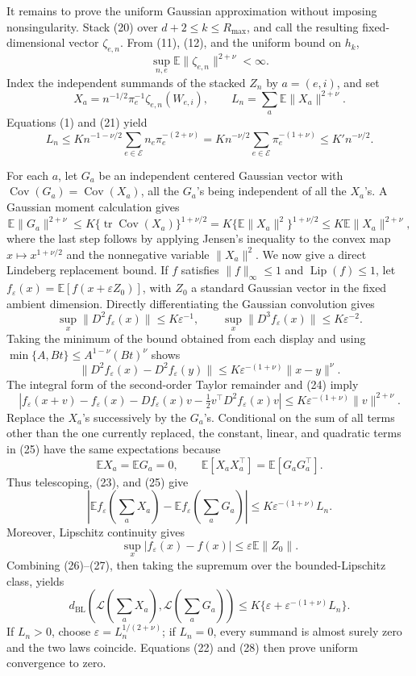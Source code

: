 It remains to prove the uniform Gaussian approximation without imposing nonsingularity.  Stack (20) over \(d+2\leq k\leq R_{\max}\), and call the resulting fixed-dimensional vector \(\zeta_{e,n}\).  From (11), (12), and the uniform bound on \(h_k\),
\[
 \sup_{n,e}\mathbb E\|\zeta_{e,n}\|^{2+\nu}<\infty. \tag{21}
\]
Index the independent summands of the stacked \(Z_n\) by \(a=(e,i)\), and set
\[
 X_a=n^{-1/2}\pi_e^{-1}\zeta_{e,n}(W_{e,i}),
 \qquad L_n=\sum_a\mathbb E\|X_a\|^{2+\nu}.
\]
Equations (1) and (21) yield
\[
 L_n\leq K n^{-1-\nu/2}\sum_{e\in\mathcal E}n_e\pi_e^{-(2+\nu)}
 =K n^{-\nu/2}\sum_{e\in\mathcal E}\pi_e^{-(1+\nu)}
 \leq K' n^{-\nu/2}. \tag{22}
\]

For each \(a\), let \(G_a\) be an independent centered Gaussian vector with
\(\operatorname{Cov}(G_a)=\operatorname{Cov}(X_a)\), all the \(G_a\)'s being independent of all the \(X_a\)'s.  A Gaussian moment calculation gives
\[
 \mathbb E\|G_a\|^{2+\nu}
 \leq K\{\operatorname{tr}\operatorname{Cov}(X_a)\}^{1+\nu/2}
 =K\{\mathbb E\|X_a\|^2\}^{1+\nu/2}
 \leq K\mathbb E\|X_a\|^{2+\nu}, \tag{23}
\]
where the last step follows by applying Jensen's inequality to the convex map \(x\mapsto x^{1+\nu/2}\) and the nonnegative variable \(\|X_a\|^2\).  We now give a direct Lindeberg replacement bound.  If \(f\) satisfies \(\|f\|_\infty\leq1\) and \(\operatorname{Lip}(f)\leq1\), let
\(f_\varepsilon(x)=\mathbb E[f(x+\varepsilon Z_0)]\), with \(Z_0\) a standard Gaussian vector in the fixed ambient dimension.  Directly differentiating the Gaussian convolution gives
\[
 \sup_x\|D^2f_\varepsilon(x)\|\leq K\varepsilon^{-1},
 \qquad
 \sup_x\|D^3f_\varepsilon(x)\|\leq K\varepsilon^{-2}.
\]
Taking the minimum of the bound obtained from each display and using
\(\min\{A,Bt\}\leq A^{1-\nu}(Bt)^\nu\) shows
\[
 \|D^2f_\varepsilon(x)-D^2f_\varepsilon(y)\|
 \leq K\varepsilon^{-(1+\nu)}\|x-y\|^\nu. \tag{24}
\]
The integral form of the second-order Taylor remainder and (24) imply
\[
 |f_\varepsilon(x+v)-f_\varepsilon(x)-Df_\varepsilon(x)v
   -\tfrac12v^\top D^2f_\varepsilon(x)v|
 \leq K\varepsilon^{-(1+\nu)}\|v\|^{2+\nu}. \tag{25}
\]
Replace the \(X_a\)'s successively by the \(G_a\)'s.  Conditional on the sum of all terms other than the one currently replaced, the constant, linear, and quadratic terms in (25) have the same expectations because
\[
 \mathbb E X_a=\mathbb E G_a=0,
 \qquad
 \mathbb E[X_aX_a^\top]=\mathbb E[G_aG_a^\top].
\]
Thus telescoping, (23), and (25) give
\[
 \left|\mathbb Ef_\varepsilon\!\left(\sum_aX_a\right)
       -\mathbb Ef_\varepsilon\!\left(\sum_aG_a\right)\right|
 \leq K\varepsilon^{-(1+\nu)}L_n. \tag{26}
\]
Moreover, Lipschitz continuity gives
\[
 \sup_x|f_\varepsilon(x)-f(x)|
 \leq\varepsilon\mathbb E\|Z_0\|. \tag{27}
\]
Combining (26)--(27), then taking the supremum over the bounded-Lipschitz class, yields
\[
 d_{\mathrm{BL}}\!\left(\mathcal L\!\left(\sum_aX_a\right),
                         \mathcal L\!\left(\sum_aG_a\right)\right)
 \leq K\{\varepsilon+\varepsilon^{-(1+\nu)}L_n\}. \tag{28}
\]
If \(L_n>0\), choose \(\varepsilon=L_n^{1/(2+\nu)}\); if \(L_n=0\), every summand is almost surely zero and the two laws coincide.  Equations (22) and (28) then prove uniform convergence to zero.

